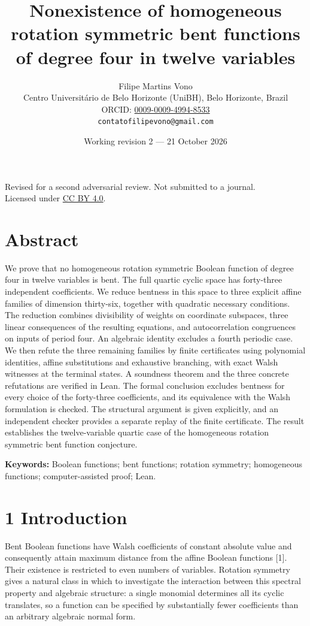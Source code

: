 \documentclass[11pt,a4paper]{article}
\title{Nonexistence of homogeneous rotation symmetric bent functions of degree four in twelve variables}
\author{Filipe Martins Vono\\\small Centro Universit\'ario de Belo Horizonte (UniBH), Belo Horizonte, Brazil\\\small ORCID: \href{https://orcid.org/0009-0009-4994-8533}{0009-0009-4994-8533}\\\small\texttt{contatofilipevono@gmail.com}}
\date{Working revision 2 --- 21 October 2026}
\begin{document}
\maketitle
\begin{center}\small Revised for a second adversarial review. Not submitted to a journal.\\Licensed under \href{https://creativecommons.org/licenses/by/4.0/}{CC BY 4.0}.\end{center}
\section*{Abstract}
We prove that no homogeneous rotation symmetric Boolean function of degree four in twelve variables is bent. The full quartic cyclic space has forty-three independent coefficients. We reduce bentness in this space to three explicit affine families of dimension thirty-six, together with quadratic necessary conditions. The reduction combines divisibility of weights on coordinate subspaces, three linear consequences of the resulting equations, and autocorrelation congruences on inputs of period four. An algebraic identity excludes a fourth periodic case. We then refute the three remaining families by finite certificates using polynomial identities, affine substitutions and exhaustive branching, with exact Walsh witnesses at the terminal states. A soundness theorem and the three concrete refutations are verified in Lean. The formal conclusion excludes bentness for every choice of the forty-three coefficients, and its equivalence with the Walsh formulation is checked. The structural argument is given explicitly, and an independent checker provides a separate replay of the finite certificate. The result establishes the twelve-variable quartic case of the homogeneous rotation symmetric bent function conjecture.

\textbf{Keywords:} Boolean functions; bent functions; rotation symmetry; homogeneous functions; computer-assisted proof; Lean.
\section*{1 Introduction}

Bent Boolean functions have Walsh coefficients of constant absolute value and consequently attain maximum distance from the affine Boolean functions [1]. Their existence is restricted to even numbers of variables. Rotation symmetry gives a natural class in which to investigate the interaction between this spectral property and algebraic structure: a single monomial determines all its cyclic translates, so a function can be specified by substantially fewer coefficients than an arbitrary algebraic normal form.
\end{document}
